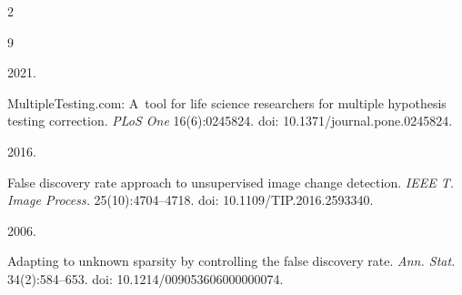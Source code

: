 
















  






  \begin{multicols}{2}



\renewcommand{\bibname}{\protect\rmfamily References}




{\small\frenchspacing

 {%


 \begin{thebibliography}{9} 


 2021.

MultipleTesting.com: A~tool for life science researchers for multiple hypothesis testing correction. \textit{PLoS One} 16(6):0245824. doi: 10.1371/journal.pone.0245824.




 2016.

False discovery rate approach to unsupervised image change detection. \textit{IEEE T. Image Process.} 25(10):4704--4718. doi: 10.1109/TIP.2016.2593340.


 2006. 

Adapting to unknown sparsity by controlling the false discovery rate. \textit{Ann. Stat.} 34(2):584--653. doi: 10.1214/009053606000000074.




\end{thebibliography}}}
\end{multicols}
